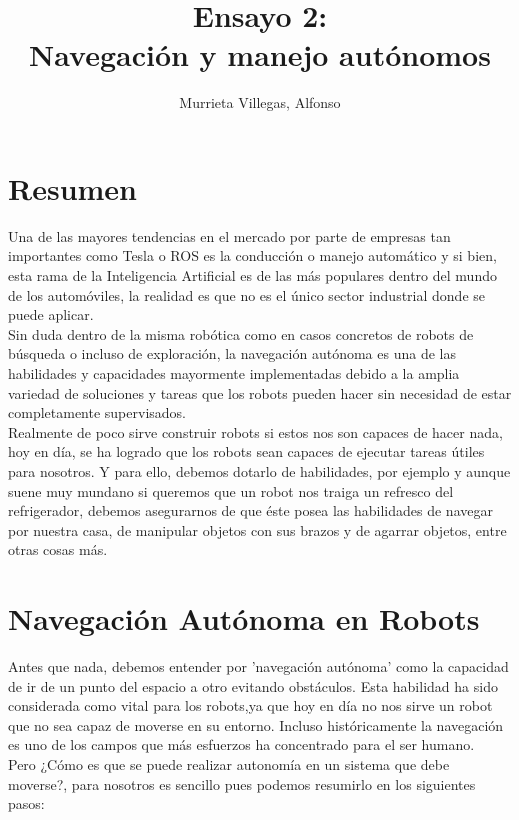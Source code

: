 \documentclass[11pt]{article}
\title{Ensayo 2:\\ Navegación y manejo autónomos }
\author{Murrieta Villegas, Alfonso}
\begin{document}
\maketitle

\section{Resumen}


Una de las mayores tendencias en el mercado por parte de empresas tan importantes como Tesla o ROS es la conducción o manejo automático y si bien, esta rama de la Inteligencia Artificial es de las más populares dentro del mundo de los automóviles, la realidad es que no es el único sector industrial donde se puede aplicar.\\

Sin duda dentro de la misma robótica como en casos concretos de robots de búsqueda o incluso de exploración, la navegación autónoma es una de las habilidades y capacidades mayormente implementadas debido a la amplia variedad de soluciones y tareas que los robots pueden hacer sin necesidad de estar completamente supervisados. \\

Realmente de poco sirve construir robots si estos nos son capaces de hacer nada, hoy en día, se ha logrado que los robots sean capaces de ejecutar tareas útiles para nosotros. Y para ello, debemos dotarlo de habilidades, por ejemplo y aunque suene muy mundano si queremos que un robot nos traiga un refresco del refrigerador, debemos asegurarnos de que éste posea las habilidades de navegar por nuestra casa, de manipular objetos con sus brazos y de agarrar objetos, entre otras cosas más.


\section{Navegación Autónoma en Robots}

Antes que nada, debemos entender por 'navegación autónoma' como la capacidad de ir de un punto del espacio a otro evitando obstáculos. Esta habilidad ha sido considerada como vital para los robots,ya que hoy en día no nos sirve un robot que no sea capaz de moverse en su entorno. Incluso históricamente la navegación es uno de los campos que más esfuerzos ha concentrado para el ser humano.\\

Pero ¿Cómo es que se puede realizar autonomía en un sistema que debe moverse?, para nosotros es sencillo pues podemos resumirlo en los siguientes pasos:
\end{document}
